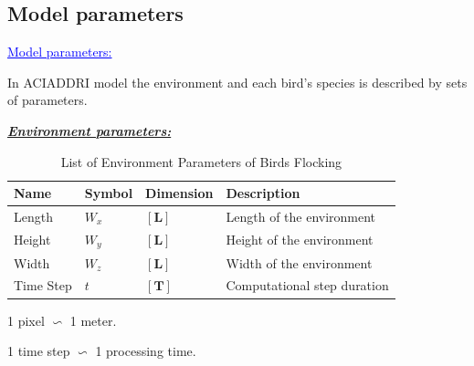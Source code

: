 \documentclass{beamer}
\begin{document}
\subsection{Model parameters}
\begin{frame}
\textcolor{blue}{\underline{Model parameters:}}

In ACIADDRI model the environment and each bird's
species is described by sets of parameters.

\medskip
\underline{\textbf{\textit{Environment parameters: }}}

\begin{table}[h!]
	\centering
	\begin{tabular}{ l l l l }
	\hline
	Name & Symbol & Dimension & Description\\
	\hline
	Length &  $W_x$ & $[\mathbf{L}]$ & Length of the environment \\
	Height & $W_y$ & $[\mathbf{L}]$ & Height of the environment \\
	Width & $W_z$ & $[\mathbf{L}]$ & Width of the environment \\
	Time Step & $t$ & $[\mathbf{T}]$ & Computational step duration \\
	\hline
	\end{tabular}
	\caption[List of Environment Parameters]{List of Environment Parameters of Birds Flocking}
	\label{tab:EnvironmentParameters}
\end{table}
1 pixel $\backsim$ 1 meter.

1 time step $\backsim$  1 processing time.
\end{frame}
\end{document}
